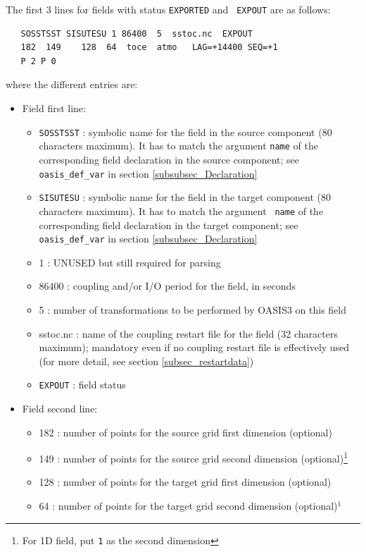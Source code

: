 The first 3 lines for fields with status {\tt EXPORTED} and {\tt
  EXPOUT} are as follows:
  \begin{verbatim}
   SOSSTSST SISUTESU 1 86400  5  sstoc.nc  EXPOUT
   182  149    128  64  toce  atmo   LAG=+14400 SEQ=+1
   P 2 P 0
\end{verbatim}
where the different entries are:
\begin{itemize}
\item Field first line:
  \begin{itemize}

  \item {\tt SOSSTSST} : symbolic name for the field in the source
    component (80 characters maximum). It has to match the argument {\tt name}
    of the corresponding field declaration in the source component; see
    {\tt oasis\_def\_var} in section \ref{subsubsec_Declaration}
  \item {\tt SISUTESU} : symbolic name for the field in the target
    component (80 characters maximum).  It has to match the argument {\tt
      name} of the corresponding field declaration in the target
    component; see {\tt oasis\_def\_var} in section
    \ref{subsubsec_Declaration}
  \item 1 : UNUSED but still required for parsing
  \item 86400 : coupling and/or I/O period for the field, in seconds
  \item 5 : number of transformations to be performed by OASIS3 on
    this field
  \item sstoc.nc : name of the coupling restart file for the field
    (32 characters maximum); mandatory even if no coupling restart file is
    effectively used (for more detail, see section
    \ref{subsec_restartdata})
  \item {\tt EXPOUT} : field status
  \end{itemize}
\item Field second line:
  \begin{itemize}
  \item 182 : number of points for the source grid first dimension
    (optional)
  \item 149 : number of points for the source grid second dimension
    (optional)\footnote{For 1D field, put {\tt 1} as the second dimension}
  \item 128 : number of points for the target grid first dimension
    (optional)
  \item 64 : number of points for the target grid second dimension
    (optional)$^{1}$


\end{itemize}
\end{itemize}
